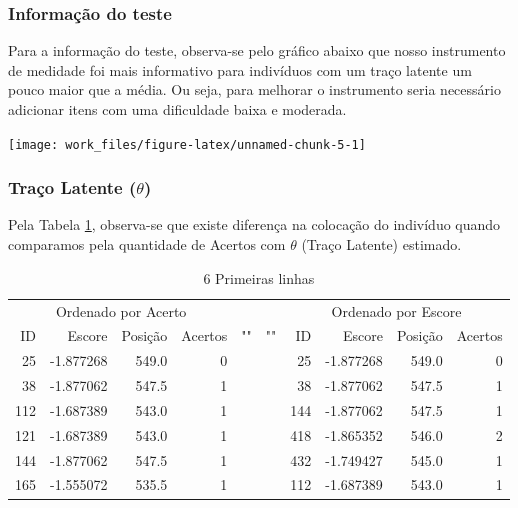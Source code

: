 \documentclass[]{article}
\begin{document}
\subsubsection{Informação do teste}\label{informacao-do-teste}

Para a informação do teste, observa-se pelo gráfico abaixo que nosso
instrumento de medidade foi mais informativo para indivíduos com um
traço latente um pouco maior que a média. Ou seja, para melhorar o
instrumento seria necessário adicionar itens com uma dificuldade baixa e
moderada.

\begin{center}\texttt{[image: work\_files/figure-latex/unnamed-chunk-5-1]} \end{center}

\subsubsection{\texorpdfstring{Traço Latente
(\(\theta\))}{Traço Latente (\textbackslash{}theta)}}\label{traco-latente-theta}

Pela Tabela \ref{tab:latente1}, observa-se que existe diferença na
colocação do indivíduo quando comparamos pela quantidade de Acertos com
\(\theta\) (Traço Latente) estimado.

\begin{table}[!h]

\caption{\label{tab:latente1}6 Primeiras linhas}
\centering
\begin{tabular}[t]{rrrrllrrrr}
\toprule
\multicolumn{4}{c}{Ordenado por Acerto} & \multicolumn{1}{c}{ } & \multicolumn{1}{c}{ } & \multicolumn{4}{c}{Ordenado por Escore} \\
\cmidrule(l{2pt}r{2pt}){1-4} \cmidrule(l{2pt}r{2pt}){7-10}
ID & Escore & Posição & Acertos & "" & "" & ID & Escore & Posição & Acertos\\
\midrule
25 & -1.877268 & 549.0 & 0 &  &  & 25 & -1.877268 & 549.0 & 0\\
38 & -1.877062 & 547.5 & 1 &  &  & 38 & -1.877062 & 547.5 & 1\\
112 & -1.687389 & 543.0 & 1 &  &  & 144 & -1.877062 & 547.5 & 1\\
121 & -1.687389 & 543.0 & 1 &  &  & 418 & -1.865352 & 546.0 & 2\\
144 & -1.877062 & 547.5 & 1 &  &  & 432 & -1.749427 & 545.0 & 1\\
165 & -1.555072 & 535.5 & 1 &  &  & 112 & -1.687389 & 543.0 & 1\\
\bottomrule
\end{tabular}
\end{table}
\end{document}
